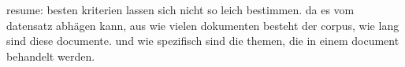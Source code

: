 




resume: besten kriterien lassen sich nicht so leich bestimmen. da es vom datensatz abhägen kann, aus wie vielen dokumenten besteht der corpus, wie lang sind diese documente. und wie spezifisch sind die themen, die in einem document behandelt werden.



\newpage